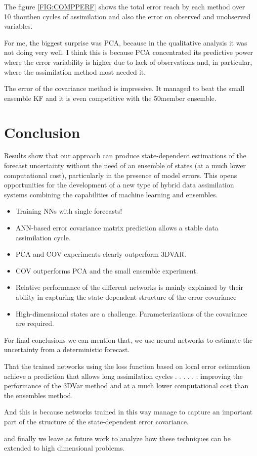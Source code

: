 \documentclass[num-refs]{wiley-article}
\begin{document}
The figure \ref{FIG:COMPPERF} shows the total  error reach by each method over 10 thouthen cycles of assimilation 
and  also the error on observed and unobserved variables. 

For me, the biggest surprise was PCA, because in the qualitative analysis it was not doing very well. 
I think this is because PCA concentrated its predictive power where the error variability is higher due to lack of observations and, in particular,  where the assimilation method most needed it.

The error of the covariance method  is impressive. It managed to beat the small ensemble KF and it is even competitive with the 50member ensemble.


\section{Conclusion}
Results show that our approach can produce state-dependent estimations of the forecast uncertainty without the need of an ensemble of states (at a much lower computational cost),  particularly in the presence of model errors. This opens opportunities for the development of a new type of hybrid data assimilation systems combining the capabilities of machine learning and ensembles.
 
\begin{itemize}
    \item Training NNs with single forecasts! 
    \item ANN-based error covariance matrix prediction allows a stable data assimilation cycle.
    \item PCA and COV experiments clearly outperform 3DVAR.
    \item COV outperforms PCA and the small ensemble experiment.
    \item Relative performance of the different networks is mainly explained by their ability in capturing the state dependent structure of the error covariance
    \item High-dimensional states are a challenge. Parameterizations of the covariance are required.
\end{itemize}
 
For final conclusions we can mention that, we use neural networks to estimate the uncertainty from a deterministic forecast.

That the trained networks using the loss function based on local error estimation achieve a prediction that allows long assimilation cycles  . . . .  . .  improving the performance of the 3DVar method and at a much lower computational cost than the ensembles method. 

And this is because networks trained in this way manage to capture an important part of the structure of the state-dependent error covariance. 

and finally we leave as future work to analyze how these techniques can be extended to high dimensional problems.

 

\end{document}
